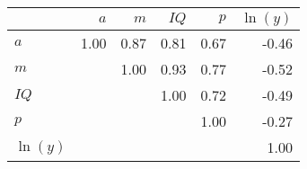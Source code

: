 \begin{tabular}{lrrrrr}
\hline
 & $a$  & $m$  & $IQ$  & $p$  & $\ln(y)$  \\
\hline
$a$ & 1.00  & 0.87  & 0.81  & 0.67  & -0.46  \\
$m$ &   & 1.00  & 0.93  & 0.77  & -0.52  \\
$IQ$ &   &   & 1.00  & 0.72  & -0.49  \\
$p$ &   &   &   & 1.00  & -0.27  \\
$\ln(y)$ &   &   &   &   & 1.00  \\
\hline
\end{tabular}%
